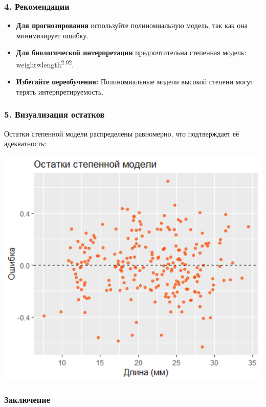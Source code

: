 \documentclass[
  letterpaper,
  DIV=11,
  numbers=noendperiod]{scrreprt}
\begin{document}
\subsubsection{\texorpdfstring{\textbf{4.
Рекомендации}}{4. Рекомендации}}\label{ux440ux435ux43aux43eux43cux435ux43dux434ux430ux446ux438ux438}

\begin{itemize}
\item
  \textbf{Для прогнозирования} используйте полиномиальную модель, так
  как она минимизирует ошибку.
\item
  \textbf{Для биологической интерпретации} предпочтительна степенная
  модель: weight∝length\textsuperscript{2.92}.
\item
  \textbf{Избегайте переобучения:} Полиномиальные модели высокой степени
  могут терять интерпретируемость.
\end{itemize}

\subsubsection{\texorpdfstring{\textbf{5. Визуализация
остатков}}{5. Визуализация остатков}}\label{ux432ux438ux437ux443ux430ux43bux438ux437ux430ux446ux438ux44f-ux43eux441ux442ux430ux442ux43aux43eux432}

Остатки степенной модели распределены равномерно, что подтверждает её
адекватность: \begin{center}
\includegraphics[width=0.6\linewidth,height=\textheight,keepaspectratio]{images/residuals_shrimp.PNG}
\end{center}

\subsubsection{\texorpdfstring{\textbf{Заключение}}{Заключение}}\label{ux437ux430ux43aux43bux44eux447ux435ux43dux438ux435}
\end{document}
